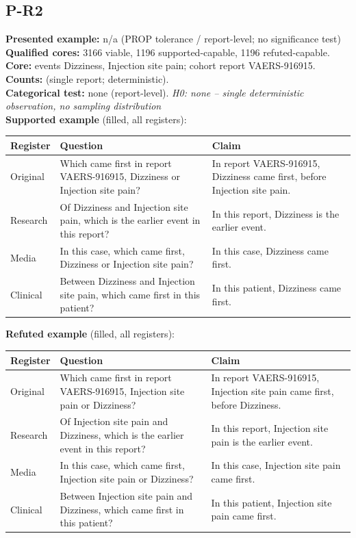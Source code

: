 \documentclass[11pt]{article}
\begin{document}
\subsection*{P-R2}
\textbf{Presented example:} n/a (PROP tolerance / report-level; no significance test) \\
\textbf{Qualified cores:} 3166 viable, 1196 supported-capable, 1196 refuted-capable. \\
\textbf{Core:} events Dizziness, Injection site pain; cohort report VAERS-916915. \\
\textbf{Counts:} (single report; deterministic). \\
\textbf{Categorical test:} none (report-level). \emph{H0: none -- single deterministic observation, no sampling distribution} \\
\textbf{Supported example} (filled, all registers): \\
\begin{tabularx}{\linewidth}{@{}l L L@{}}
\toprule
\textbf{Register} & \textbf{Question} & \textbf{Claim} \\
\midrule
Original & Which came first in report VAERS-916915, Dizziness or Injection site pain? & In report VAERS-916915, Dizziness came first, before Injection site pain. \\
Research & Of Dizziness and Injection site pain, which is the earlier event in this report? & In this report, Dizziness is the earlier event. \\
Media & In this case, which came first, Dizziness or Injection site pain? & In this case, Dizziness came first. \\
Clinical & Between Dizziness and Injection site pain, which came first in this patient? & In this patient, Dizziness came first. \\
\bottomrule
\end{tabularx}
\vspace{3pt}
\textbf{Refuted example} (filled, all registers): \\
\begin{tabularx}{\linewidth}{@{}l L L@{}}
\toprule
\textbf{Register} & \textbf{Question} & \textbf{Claim} \\
\midrule
Original & Which came first in report VAERS-916915, Injection site pain or Dizziness? & In report VAERS-916915, Injection site pain came first, before Dizziness. \\
Research & Of Injection site pain and Dizziness, which is the earlier event in this report? & In this report, Injection site pain is the earlier event. \\
Media & In this case, which came first, Injection site pain or Dizziness? & In this case, Injection site pain came first. \\
Clinical & Between Injection site pain and Dizziness, which came first in this patient? & In this patient, Injection site pain came first. \\
\bottomrule
\end{tabularx}
\vspace{3pt}
\end{document}
